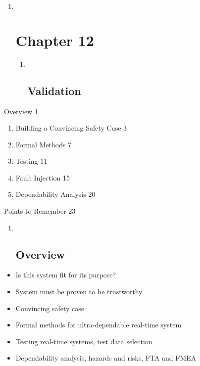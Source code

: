 \begin{enumerate}
\item ~
  \section{Chapter 12}\label{chapter-12}

  \begin{enumerate}
  \item ~
    \subsection{Validation}\label{validation}
  \end{enumerate}
\end{enumerate}

Overview 1

\begin{enumerate}
\def\labelenumi{\arabic{enumi}.}
\item
  Building a Convincing Safety Case 3
\item
  Formal Methods 7
\item
  Testing 11
\item
  Fault Injection 15
\item
  Dependability Analysis 20
\end{enumerate}

Points to Remember 23

\begin{enumerate}
\item ~
  \subsection{}\label{section}

  \subsection{Overview}\label{overview}
\end{enumerate}

\begin{itemize}
\item
  Is this system fit for its purpose?
\item
  System must be proven to be trustworthy
\item
  Convincing safety case
\item
  Formal methods for ultra-dependable real-time system
\item
  Testing real-time systems, test data selection
\item
  Dependability analysis, hazards and risks, FTA and FMEA
\end{itemize}

